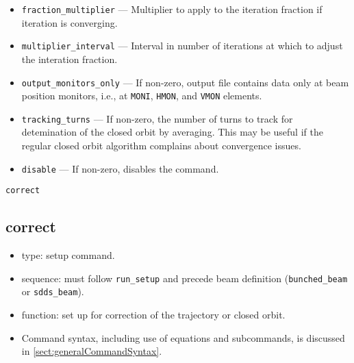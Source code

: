 \documentclass[11pt]{article}
\begin{document}
\begin{itemize}
\item \verb|fraction_multiplier| --- Multiplier to apply to the iteration fraction if
  iteration is converging.
\item \verb|multiplier_interval| --- Interval in number of iterations at which to adjust
  the interation fraction.
\item \verb|output_monitors_only|  --- If non-zero, output file contains data only at beam position monitors,
  i.e., at \verb|MONI|, \verb|HMON|, and \verb|VMON| elements.
\item \verb|tracking_turns| --- If non-zero, the number of turns to track for detemination 
  of the closed orbit by averaging. This may be useful if the regular closed orbit algorithm
  complains about convergence issues.
\item \verb|disable| --- If non-zero, disables the command.
\end{itemize}

\newpage
\begin{center}{\Large\verb|correct|}\end{center}
\subsection{correct \label{subsec:correct}}

\begin{itemize}
\item type: setup command.
\item sequence: must follow \verb|run_setup| and precede beam definition (\verb|bunched_beam| or \verb|sdds_beam|).
\item function: set up for correction of the trajectory or closed orbit.
\item Command syntax, including use of equations and subcommands, is discussed in \ref{sect:generalCommandSyntax}.
\end{itemize}
\end{document}
